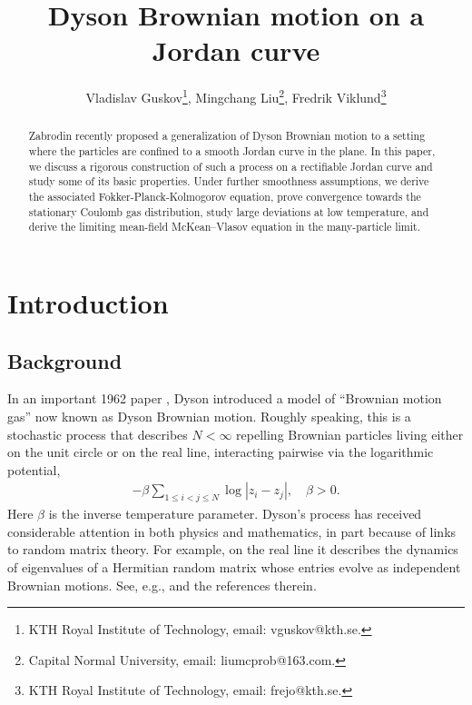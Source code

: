 \documentclass[11pt]{article}
\title{Dyson Brownian motion on a Jordan curve}
\author{ 
Vladislav Guskov\footnote{KTH Royal Institute of Technology, email: vguskov@kth.se.}, 
Mingchang Liu\footnote{Capital Normal University, email: liumc\textunderscore prob@163.com.}, 
Fredrik Viklund\footnote{KTH Royal Institute of Technology, email: frejo@kth.se.}
}
\numberwithin{equation}{section}
\theoremstyle{definition}
\begin{document}
\maketitle
\begin{abstract}
Zabrodin recently proposed a generalization of Dyson Brownian motion to a setting where the particles are confined to a smooth Jordan curve in the plane. In this paper, we discuss a rigorous construction of such a process on a rectifiable Jordan curve and study some of its basic properties. Under further smoothness assumptions, we derive the associated Fokker-Planck-Kolmogorov equation, prove convergence towards the stationary Coulomb gas distribution, study large deviations at low temperature, and derive the limiting mean-field McKean--Vlasov equation in the many-particle limit. 
\end{abstract}

\tableofcontents

\section{Introduction}
\subsection{Background}In an important 1962 paper \cite{dyson1962brownian}, Dyson introduced a model of ``Brownian motion gas'' now known as Dyson Brownian motion. Roughly speaking, this is a stochastic process that describes $N < \infty$ repelling Brownian particles living either on the unit circle or on the real line, interacting pairwise via the logarithmic potential,
 \begin{align} \label{eq:Coulomb_potential}
    - \beta\sum\limits_{1\le i<j\le N}\log|z_{i}-z_{j}|, \quad \beta>0.
     \end{align}
     Here $\beta$ is the inverse temperature parameter. Dyson's process has received considerable attention in both physics and mathematics, in part because of links to random matrix theory. For example, on the real line it describes the dynamics of eigenvalues of a Hermitian random matrix whose entries evolve as independent Brownian motions. See, e.g., \cite{cepa1997diffusing, cepa2001brownian} and the references therein. 
\end{document}
